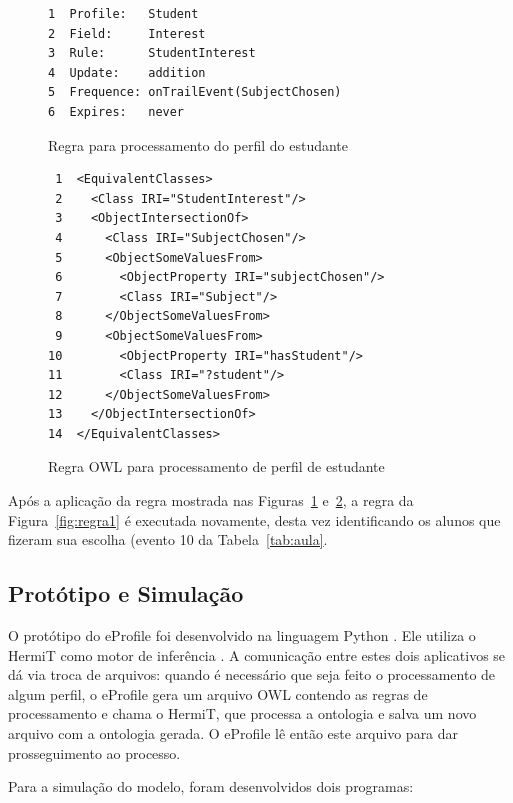 \begin{figure}[!t]
\begin{verbatim}
1  Profile:   Student
2  Field:     Interest
3  Rule:      StudentInterest
4  Update:    addition
5  Frequence: onTrailEvent(SubjectChosen)
6  Expires:   never
\end{verbatim}
  \caption{Regra para processamento do perfil do estudante}
  \label{fig:regra3}
\end{figure}

\begin{figure}[!t]
\begin{verbatim}
 1  <EquivalentClasses>
 2    <Class IRI="StudentInterest"/>
 3    <ObjectIntersectionOf>
 4      <Class IRI="SubjectChosen"/>
 5      <ObjectSomeValuesFrom>
 6        <ObjectProperty IRI="subjectChosen"/>
 7        <Class IRI="Subject"/>
 8      </ObjectSomeValuesFrom>
 9      <ObjectSomeValuesFrom>
10        <ObjectProperty IRI="hasStudent"/>
11        <Class IRI="?student"/>
12      </ObjectSomeValuesFrom>
13    </ObjectIntersectionOf>
14  </EquivalentClasses>
\end{verbatim}
  \caption{Regra OWL para processamento de perfil de estudante}
  \label{fig:regra2}
\end{figure}

Após a aplicação da regra mostrada nas Figuras~\ref{fig:regra3} e~\ref{fig:regra2}, a regra da Figura~\ref{fig:regra1} é executada novamente, desta vez identificando os alunos que fizeram sua escolha (evento 10 da Tabela~\ref{tab:aula}.



\subsection{Protótipo e Simulação}
\label{sec:simulacao_cen1}

O protótipo do eProfile foi desenvolvido na linguagem Python \cite{python}. Ele utiliza o HermiT como motor de inferência \cite{motik09}. A comunicação entre estes dois aplicativos se dá via troca de arquivos: quando é necessário que seja feito o processamento de algum perfil, o eProfile gera um arquivo OWL contendo as regras de processamento e chama o HermiT, que processa a ontologia e salva um novo arquivo com a ontologia gerada. O eProfile lê então este arquivo para dar prosseguimento ao processo.

Para a simulação do modelo, foram desenvolvidos dois programas:

